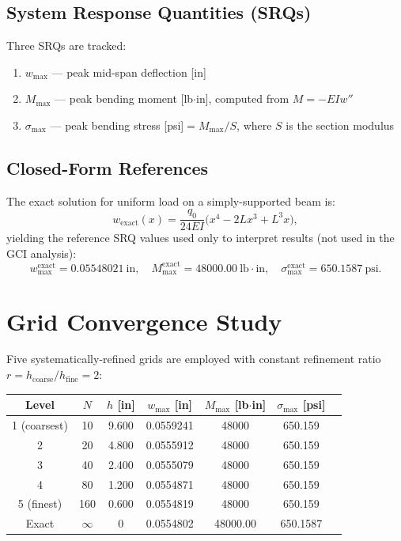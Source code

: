 \documentclass[11pt,letterpaper]{article}
\newcommand{\EI}{EI}
\begin{document}
\subsection*{System Response Quantities (SRQs)}

Three SRQs are tracked:
\begin{enumerate}[nosep]
  \item $w_{\max}$ — peak mid-span deflection [in]
  \item $M_{\max}$ — peak bending moment [lb$\cdot$in], computed from $M=-\EI w''$
  \item $\sigma_{\max}$ — peak bending stress [psi]$= M_{\max}/S$, where $S$ is the section modulus
\end{enumerate}

\subsection*{Closed-Form References}

The exact solution for uniform load on a simply-supported beam is:
\begin{equation}
  w_{\mathrm{exact}}(x)=\frac{q_0}{24\EI}\bigl(x^4-2Lx^3+L^3 x\bigr),
\end{equation}
yielding the reference SRQ values used only to interpret results (not used
in the GCI analysis):
\[
  w_{\max}^{\mathrm{exact}}=0.05548021\ \text{in},\quad
  M_{\max}^{\mathrm{exact}}=48000.00\ \text{lb}\cdot\text{in},\quad
  \sigma_{\max}^{\mathrm{exact}}=650.1587\ \text{psi}.
\]

\section{Grid Convergence Study}
\label{sec:grids}

Five systematically-refined grids are employed with constant refinement ratio
$r=h_{\mathrm{coarse}}/h_{\mathrm{fine}}=2$:

\begin{center}
\begin{tabular}{ccccccc}
  \toprule
  Level & $N$ & $h$ [in] & $w_{\max}$ [in] & $M_{\max}$ [lb$\cdot$in] & $\sigma_{\max}$ [psi] \\
  \midrule
  1 (coarsest) & 10  & 9.600 & 0.0559241 & 48000 & 650.159 \\
  2            & 20  & 4.800 & 0.0555912 & 48000 & 650.159 \\
  3            & 40  & 2.400 & 0.0555079 & 48000 & 650.159 \\
  4            & 80  & 1.200 & 0.0554871 & 48000 & 650.159 \\
  5 (finest)   & 160 & 0.600 & 0.0554819 & 48000 & 650.159 \\
  \midrule
  Exact        & $\infty$ & 0 & 0.0554802 & 48000.00 & 650.1587 \\
  \bottomrule
\end{tabular}
\end{center}
\end{document}
